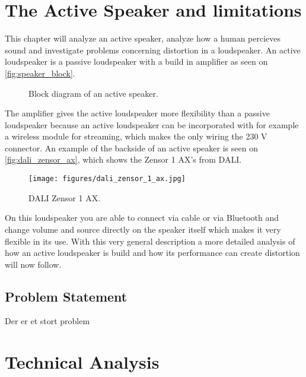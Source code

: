 


\chapter{The Active Speaker and limitations}
This chapter will analyze an active speaker, analyze how a human percieves sound and investigate problems concerning distortion in a loudspeaker. An active loudspeaker is a passive loudspeaker with a build in amplifier as seen on \autoref{fig:speaker_block}. \\
\begin{figure}[H]
\centering
{}

\caption{Block diagram of an active speaker.}
\label{fig:speaker_block}
\end{figure}
The amplifier gives the active loudspeaker more flexibility than a passive loudspeaker because an active loudspeaker can be incorporated with for example a wireless module for streaming, which makes the only wiring the 230 V connector. An example of the backside of an active speaker is seen on \autoref{fig:dali_zensor_ax}, which shows the Zensor 1 AX's from DALI.
\begin{figure}[H]
\centering
\texttt{[image: figures/dali\_zensor\_1\_ax.jpg]}
\caption{DALI Zensor 1 AX.}
\label{fig:dali_zensor_ax}
\end{figure}
On this loudspeaker you are able to connect via cable or via Bluetooth and change volume and source directly on the speaker itself which makes it very flexible in its use. With this very general description a more detailed analysis of how an active loudspeaker is build and how its performance can create distortion will now follow. 







\section{Problem Statement}

Der er et stort problem
\chapter{Technical Analysis}









